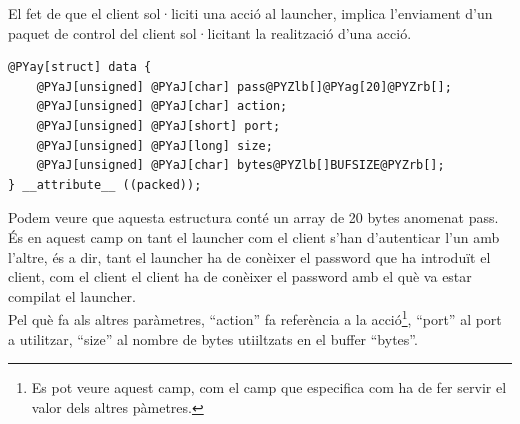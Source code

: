 El fet de que el client sol·liciti una acció al launcher, implica l'enviament d'un paquet de control del client sol·licitant
la realització d'una acció. 

\begin{Verbatim}[commandchars=@\[\]]
@PYay[struct] data {
    @PYaJ[unsigned] @PYaJ[char] pass@PYZlb[]@PYag[20]@PYZrb[];
    @PYaJ[unsigned] @PYaJ[char] action;
    @PYaJ[unsigned] @PYaJ[short] port;
    @PYaJ[unsigned] @PYaJ[long] size;
    @PYaJ[unsigned] @PYaJ[char] bytes@PYZlb[]BUFSIZE@PYZrb[];
} __attribute__ ((packed));
\end{Verbatim}

Podem veure que aquesta estructura conté un array de 20 bytes anomenat pass. És en aquest camp on tant el launcher
com el client s'han d'autenticar l'un amb l'altre, és a dir, tant el launcher ha de conèixer el password que ha introduït 
el client, com el client el client ha de conèixer el password amb el què va estar compilat el launcher.\\

Pel què fa als altres paràmetres, ``action'' fa referència a la acció\footnote{Es pot 
veure aquest camp, com el camp que especifica com ha de fer servir el valor dels altres pàmetres.}, ``port'' al port a 
utilitzar, ``size'' al nombre de bytes utiiltzats en el buffer ``bytes''.

